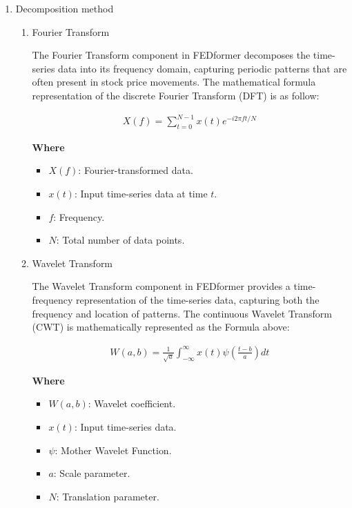 \documentclass[conference]{IEEEtran}
\begin{document}
\begin{enumerate}
    \item Decomposition method
    \begin{enumerate}
        \item Fourier Transform

        The Fourier Transform component in FEDformer decomposes the time-series data into its frequency domain, capturing periodic patterns that are often present in stock price movements. The mathematical formula representation of the discrete Fourier Transform (DFT) is as follow:

        \begin{align*}
            X(f) = \sum_{t=0}^{N-1} x(t) e^{-i 2 \pi f t / N}
        \end{align*}

        \textbf{Where}
        \begin{itemize}
            \item $X(f)$: Fourier-transformed data.
            \item $x(t)$: Input time-series data at time $t$.
            \item $f$: Frequency.
            \item $N$: Total number of data points.
        \end{itemize}
        
        \item Wavelet Transform

        The Wavelet Transform component in FEDformer provides a time-frequency representation of the time-series data, capturing both the frequency and location of patterns. The continuous Wavelet Transform (CWT) is mathematically represented as the Formula above:

        \begin{align*}
            W(a, b) = \frac{1}{\sqrt{a}} \int_{-\infty}^{\infty} x(t) \psi \left( \frac{t-b}{a} \right) dt
        \end{align*}

        \textbf{Where}
        \begin{itemize}
            \item $W(a, b)$: Wavelet coefficient.
            \item $x(t)$: Input time-series data.
            \item $\psi$: Mother Wavelet Function.
            \item $a$: Scale parameter.
            \item $N$: Translation parameter.
        \end{itemize}
        

\end{enumerate}
\end{enumerate}
\end{document}
